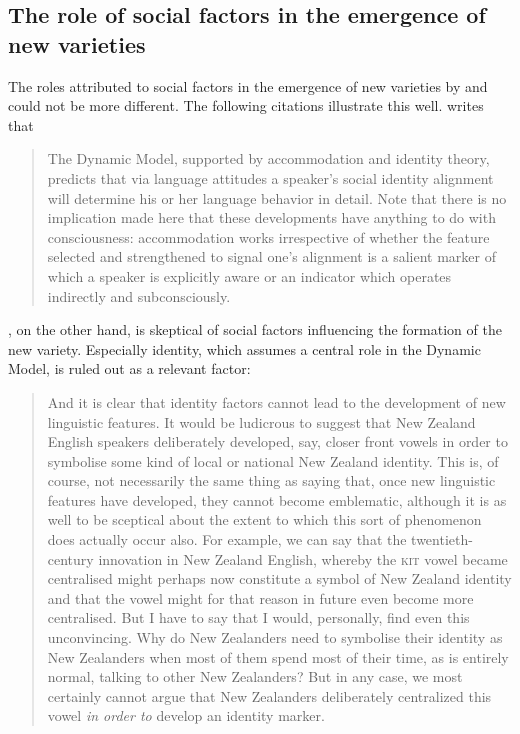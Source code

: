\subsection{The role of social factors in the emergence of new varieties}
\label{bkm:Ref521576818}\hypertarget{Toc63021208}{}
The roles attributed to social factors in the emergence of new varieties by \citet{Trudgill2004} and \citet{Schneider2007} could not be more different. The following citations illustrate this well. \citet[95]{Schneider2007} writes that


\begin{quote}
The Dynamic Model, supported by accommodation and identity theory, predicts that via language attitudes a speaker’s social identity alignment will determine his or her language behavior in detail. Note that there is no implication made here that these developments have anything to do with consciousness: accommodation works irrespective of whether the feature selected and strengthened to signal one’s alignment is a salient marker of which a speaker is explicitly aware or an indicator which operates indirectly and subconsciously.
\end{quote}


\citet{Trudgill2004}, on the other hand, is skeptical of social factors influencing the formation of the new variety. Especially identity, which assumes a central role in the Dynamic Model, is ruled out as a relevant factor:


\begin{quote}
And it is clear that identity factors cannot lead to the development of new linguistic features. It would be ludicrous to suggest that New Zealand English speakers deliberately developed, say, closer front vowels in order to symbolise some kind of local or national New Zealand identity. This is, of course, not necessarily the same thing as saying that, once new linguistic features have developed, they cannot become emblematic, although it is as well to be sceptical about the extent to which this sort of phenomenon does actually occur also. For example, we can say that the twentieth-century innovation in New Zealand English, whereby the \textsc{kit} vowel became centralised might perhaps now constitute a symbol of New Zealand identity and that the vowel might for that reason in future even become more centralised. But I have to say that I would, personally, find even this unconvincing. Why do New Zealanders need to symbolise their identity as New Zealanders when most of them spend most of their time, as is entirely normal, talking to other New Zealanders? But in any case, we most certainly cannot argue that New Zealanders deliberately centralized this vowel \emph{in order to} develop an identity marker. \citep[157]{Trudgill2004}
\end{quote}

